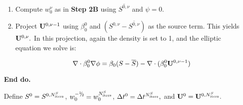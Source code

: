 \begin{enumerate}
\begin{enumerate}
  \item Compute $w_0^{\nu}$ as in {\bf Step 2B} using $\overline{S^{0,\nu}}$ and $\psi=0$.
        
  \item Project ${\bf U}^{0,\nu-1}$ using $\beta_0^0$ and 
        $(S^{0,\nu} - \overline{S^{0,\nu}})$ as the source term.  
        This yields ${\bf U}^{0,\nu}.$  In this projection, again the density is 
        set to 1, and the elliptic equation we solve is:
   
   \begin{equation}
   \nabla \cdot \beta_0^0 \nabla \phi = \beta_0 (S - \overline{S})- \nabla \cdot (\beta_0^0 {\bf U}^{0,\nu-1})
   \end{equation}


  \end{enumerate}

  {\bf End do.}

  Define $S^0 = S^{0,N_{\rm iters}^S}$, $w_0^{-\myhalf} = w_0^{N_{\rm iters}^S}$, 
$\Delta t^0 = \Delta t^{N_{\rm iters}^S},$ and ${\bf U}^0 = {\bf U}^{0,N_{\rm iters}^S}.$

\end{enumerate}

